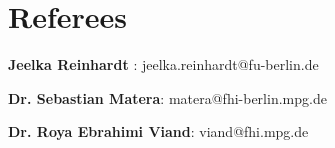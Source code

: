 \documentclass[A4,11pt]{article}
\newcommand{\CVItem}[1]{
  \item\small{
    {#1 \vspace{-2pt}}
  }
}
\begin{document}
\section{Referees}
\CVItem{\textbf{Jeelka Reinhardt}}: jeelka.reinhardt@fu-berlin.de
\CVItem{\textbf{Dr. Sebastian Matera}: matera@fhi-berlin.mpg.de}

\CVItem{\textbf{Dr. Roya Ebrahimi Viand}: viand@fhi.mpg.de}





   


    
    


    

    

\end{document}
